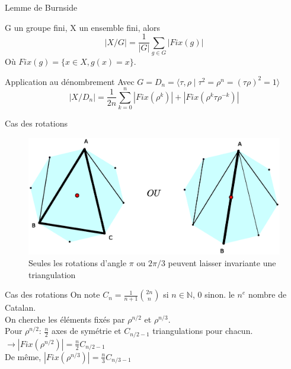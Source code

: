 \documentclass[french,xcolor=dvipsnames]{beamer}
\begin{document}
		\begin{frame}{Lemme de Burnside}
			\begin{theorem}
				G un groupe fini, X un ensemble fini, alors
				\[
				|X/G| = \frac{1}{|G|}\sum_{g\in G}{|Fix(g)|}
				\]
				Où $Fix(g) = \{x\in X, g(x) = x\}$.
			\end{theorem}
		\end{frame}
		
		\begin{frame}{Application au dénombrement}
			Avec $G=D_{n}=\langle\tau,\rho\mid \tau^{2}=\rho^{n}=(\tau\rho)^{2}=1\rangle$
			\[
				|X/D_{n}| = \frac{1}{2n}\sum_{k=0}^{n}|Fix(\rho^{k})|+|Fix(\rho^{k}\tau\rho^{-k})|
			\]
		\end{frame}
		\begin{frame}{Cas des rotations}
		\begin{figure}[1]
		\includegraphics[scale=0.45]{invariances_rotation.eps}
			\caption{Seules les rotations d'angle $\pi$ ou $2\pi/3$ peuvent laisser invariante une triangulation}
			\end{figure}
		\end{frame}
		
		\begin{frame}{Cas des rotations}
			On note $C_{n}=\frac{1}{n+1}\binom{2n}{n}$ si $n\in\mathbb{N}$, $0$ sinon. 
 le $n^{e}$ nombre de Catalan.\\
			On cherche les éléments fixés par $\rho^{n/2}$ et $\rho^{n/3}$.\\
			Pour $\rho^{n/2}$: $\frac{n}{2}$ axes de symétrie et $C_{n/2-1}$ triangulations pour chacun.\\
			$\longrightarrow |Fix(\rho^{n/2})|=\frac{n}{2}C_{n/2-1}$\\
			De même, $|Fix(\rho^{n/3})|=\frac{n}{3}C_{n/3-1}$
		\end{frame}
	
\end{document}
